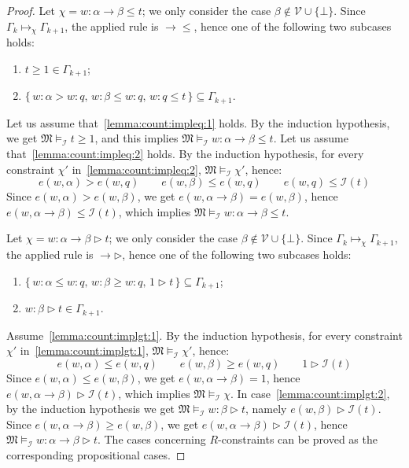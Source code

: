 \documentclass[copyright,creativecommons]{eptcs}
\newcommand{\PV}{\Vcal}
\newcommand{\gt}{\rhd}
\newcommand{\app}[3]{#2\mapsto_{#1} #3}
\newcommand{\M}{\mathfrak{M}}
\renewcommand{\a}{\alpha}
\renewcommand{\b}{\beta}
\newcommand{\G}{\Gamma}
\newcommand{\Ical}{\mathcal{I}}
\newcommand{\Vcal}{\mathcal{V}}
\begin{document}
\begin{proof}
 
 Let $\chi= w:\a\to \b \leq t$; we only consider the case
 $\b\not\in\PV\cup\{\bot\}$.  Since $\app{\chi}{\G_k}{\G_{k+1}}$, the
 applied rule is $\to\leq$, hence one of the following two subcases
 holds:
 
 \begin{enumerate}[label=(B\arabic*), ref=(B\arabic*),leftmargin=*]
 \item\label{lemma:count:impleq:1}
   $t\geq 1\in \G_{k+1}$;
   
 \item\label{lemma:count:impleq:2}
   $\{\,w:\a> w :q,\,w:\b\leq w:q,\,w:q\leq t\,\} \subseteq \G_{k+1}$.
 \end{enumerate}
 Let us assume that~\ref{lemma:count:impleq:1} holds.  By the
 induction hypothesis, we get $\M\models_\Ical t\geq 1$, and this
 implies $\M\models_\Ical w:\a\to \b \leq t$.  Let us assume
 that~\ref{lemma:count:impleq:2} holds.  By the induction hypothesis,
 for every constraint $\chi'$ in~\ref{lemma:count:impleq:2},
 $\M\models_\Ical \chi'$, hence:
 \[
 e(w,\a) > e(w,q) \qquad e(w,\b) \leq e(w,q) \qquad e(w,q) \leq \Ical(t)
 \]  
 Since $e(w,\a) > e(w,\b)$, we get $e(w,\a\to \b) = e(w,\b)$, hence
 $e(w,\a\to \b) \leq \Ical(t)$, which implies $\M\models_\Ical w:\a\to
 \b \leq t$.


 Let $\chi= w:\a\to \b \gt t$; we only consider the case
 $\b\not\in\PV\cup\{\bot\}$.  Since $\app{\chi}{\G_k}{\G_{k+1}}$, the
 applied rule is $\to\gt$, hence one of the following two subcases
 holds:
 
 \begin{enumerate}[label=(C\arabic*), ref=(C\arabic*),leftmargin=*]
 \item\label{lemma:count:implgt:1}
   $\{\,w:\a \leq w:q,\,w:\b\geq  w:q,\,1\gt t\,\}\subseteq\G_{k+1}$;
   
 \item\label{lemma:count:implgt:2}
   $w:\b\gt t\in\G_{k+1}$.
 \end{enumerate}
 
 \noindent
 Assume~\ref{lemma:count:implgt:1}.  By the induction hypothesis, for
 every constraint $\chi'$ in~\ref{lemma:count:implgt:1},
 $\M\models_\Ical \chi'$, hence:
 \[
 e(w,\a) \leq  e(w,q) \qquad e(w,\b) \geq e(w,q) \qquad 1 \gt \Ical(t)
 \]  
 Since $e(w,\a)\leq e(w,\b)$, we get $e(w,\a\to \b)=1$, hence
 $e(w,\a\to \b)\gt \Ical(t)$, which implies $\M\models_\Ical\chi$.  In
 case~\ref{lemma:count:implgt:2}, by the induction hypothesis we get
 $\M\models_\Ical w:\b\gt t$, namely $e(w,\b)\gt\Ical(t)$.  Since
 $e(w,\a\to\b)\geq e(w,\b)$, we get $e(w,\a\to\b)\gt\Ical(t)$, hence
 $\M\models_\Ical w:\a\to \b \gt t$.  The cases concerning
 $R$-constraints can be proved as the corresponding propositional
 cases.



\end{proof}
\end{document}

